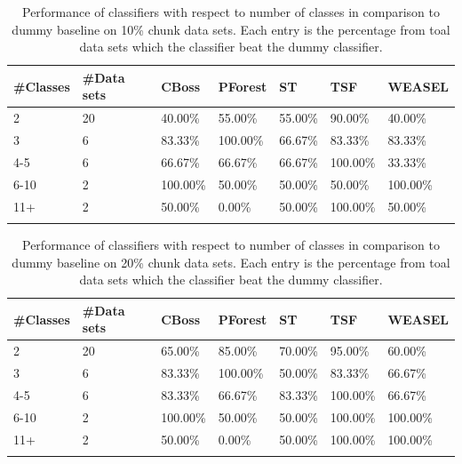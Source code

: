\begin{table}[!htb]
	\setlength\extrarowheight{2pt} %
	\begin{tabularx}{\textwidth}{|X|X|X|X|X|X|X|}
	\hline
	\textbf{\#Classes} & \textbf{\#Data sets} & \textbf{CBoss} & \textbf{PForest} & \textbf{ST} & \textbf{TSF} & \textbf{WEASEL} \\ \hline
		2 & 20 & 40.00\% & 55.00\% & 55.00\% & 90.00\% & 40.00\% \\ \hline
		3 & 6 & 83.33\% & 100.00\% & 66.67\% & 83.33\% & 83.33\% \\ \hline
		4-5 & 6 & 66.67\% & 66.67\% & 66.67\% & 100.00\% & 33.33\% \\ \hline
		6-10 & 2 & 100.00\% & 50.00\% & 50.00\% & 50.00\% & 100.00\% \\ \hline
		11+ & 2 & 50.00\% & 0.00\% & 50.00\% & 100.00\% & 50.00\% \\ \hline
  \caption{Performance of classifiers with respect to number of classes in comparison to dummy baseline on 10\% chunk data sets. Each entry is the percentage from toal data sets which the classifier beat the dummy classifier.}
  \end{tabularx}
\end{table}

\begin{table}[!htb]
	\setlength\extrarowheight{2pt} %
	\begin{tabularx}{\textwidth}{|X|X|X|X|X|X|X|}
	\hline
	\textbf{\#Classes} & \textbf{\#Data sets} & \textbf{CBoss} & \textbf{PForest} & \textbf{ST} & \textbf{TSF} & \textbf{WEASEL} \\ \hline
		2 & 20 & 65.00\% & 85.00\% & 70.00\% & 95.00\% & 60.00\% \\ \hline
		3 & 6 & 83.33\% & 100.00\% & 50.00\% & 83.33\% & 66.67\% \\ \hline
		4-5 & 6 & 83.33\% & 66.67\% & 83.33\% & 100.00\% & 66.67\% \\ \hline
		6-10 & 2 & 100.00\% & 50.00\% & 50.00\% & 100.00\% & 100.00\% \\ \hline
		11+ & 2 & 50.00\% & 0.00\% & 50.00\% & 100.00\% & 100.00\% \\ \hline
  \caption{Performance of classifiers with respect to number of classes in comparison to dummy baseline on 20\% chunk data sets. Each entry is the percentage from toal data sets which the classifier beat the dummy classifier.}
  \end{tabularx}
\end{table}

